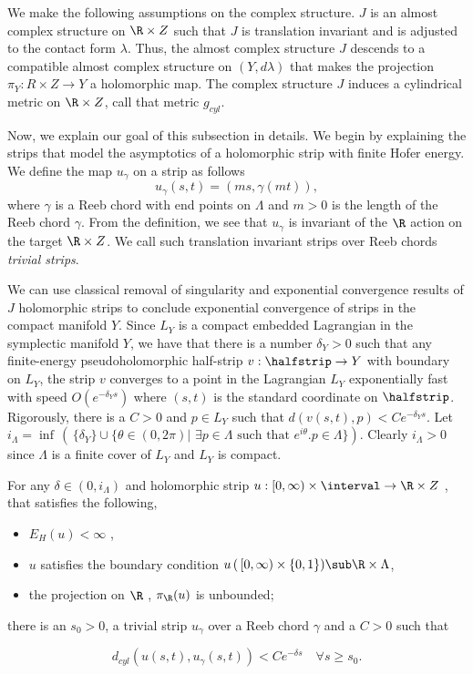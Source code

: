 We make the following assumptions on the complex structure.  $J$ is an almost complex structure on $\R \times Z$ such that $J$ is translation invariant and is adjusted to the contact form $\lambda$. Thus, the almost complex structure $J$ descends to a compatible almost complex structure on $(Y,d\lambda)$ that makes the projection $ \pi_Y : R\times Z \to Y$ a holomorphic map. The complex structure $J$ induces a cylindrical metric on $\R \times Z$, call that metric $g_{cyl}$.

Now, we explain our goal of this subsection in details. We begin by explaining the strips that model the asymptotics of a holomorphic strip with finite Hofer energy. We define the map $u_\gamma$ on a  strip as follows 
$$u_\gamma(s,t) = (ms,\gamma(mt)),$$ where $ \gamma $ is a Reeb chord with end points on $\Lambda$ and $m>0$ is the length of the Reeb chord $\gamma$. From the definition, we see that $u_\gamma$ is invariant of the $\R$ action on the target $\R \times Z$. We call such translation invariant strips over Reeb chords \textit{trivial strips}.


We can use classical removal of singularity and exponential convergence results of $J$ holomorphic strips to conclude exponential convergence of strips in the compact manifold  $Y$.  Since $L_Y$ is a compact embedded Lagrangian in  the symplectic manifold $Y$, we have that there is a number $\delta_Y>0$ such that any finite-energy pseudoholomorphic half-strip $ v : \halfstrip \to Y $ with boundary on $L_Y$, the strip $v$ converges to a point in the Lagrangian $L_Y$ exponentially fast with speed $O(e^{-\delta_Y s})$ where $(s,t)$ is the standard coordinate on $\halfstrip$. Rigorously, there is a $C>0$ and $p \in L_Y$ such that $d(v(s,t),p) < Ce^{-\delta_Y s}$.  Let $i_\Lambda = \inf  \,(\, \{ \delta_Y\} \cup \{ \theta \in (0,2\pi)| \, \, \exists p\in \Lambda \, \, \text {such that }  e^{i\theta}.p \in \Lambda \})$. Clearly $i_\Lambda > 0$ since $\Lambda$ is a finite cover of $L_Y$ and $L_Y$ is compact.

\begin{Theorem} \label{thm:exponential conv}
For any $\delta \in (0,i_\Lambda) $ and holomorphic strip $u:[0,\infty) \times \interval \to \R \times Z$ , that satisfies the following,
\begin{itemize}
    \item $E_H(u)<\infty$ ,
    \item $u$ satisfies the boundary condition  $u\, ( \,[0,\infty) \times \{0,1\}) \sub\R \times \Lambda$,
    \item the projection on $\R$ , $\pi_\R (u)$ is unbounded;
\end{itemize}  there is an $s_0 > 0$, a trivial strip $u_\gamma$ over a Reeb chord $\gamma$ and a $C>0$ such that

\begin{equation}
\label{expConv}
     d_{cyl}(u(s,t),u_\gamma(s,t)) < Ce^{-\delta s} \quad \forall s\geq s_0.
\end{equation} 

\end{Theorem}


